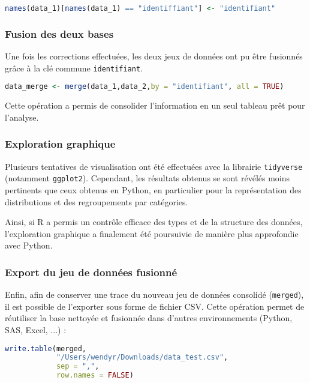 \begin{lstlisting}[language=R, caption=Correction de l’orthographe d’une variable]
    names(data_1)[names(data_1) == "identiffiant"] <- "identifiant"
\end{lstlisting}

\subsubsection{Fusion des deux bases}
Une fois les corrections effectuées, les deux jeux de données ont pu être fusionnés grâce à la clé commune \texttt{identifiant}.  

\begin{lstlisting}[language=R, caption=Fusion des bases de données]
    data_merge <- merge(data_1,data_2,by = "identifiant", all = TRUE)
\end{lstlisting}

Cette opération a permis de consolider l'information en un seul tableau prêt pour l'analyse.  

\subsubsection{Exploration graphique}
Plusieurs tentatives de visualisation ont été effectuées avec la librairie \texttt{tidyverse} (notamment \texttt{ggplot2}).  
Cependant, les résultats obtenus se sont révélés moins pertinents que ceux obtenus en Python, en particulier pour la représentation des distributions et des regroupements par catégories.  

Ainsi, si R a permis un contrôle efficace des types et de la structure des données, l'exploration graphique a finalement été poursuivie de manière plus approfondie avec Python.
\subsubsection{Export du jeu de données fusionné}
Enfin, afin de conserver une trace du nouveau jeu de données consolidé (\texttt{merged}), il est possible de l'exporter sous forme de fichier CSV.  
Cette opération permet de réutiliser la base nettoyée et fusionnée dans d'autres environnements (Python, SAS, Excel, ...) :

\begin{lstlisting}[language=R, caption=Exportation du jeu de données fusionné]
write.table(merged,
            "/Users/wendyr/Downloads/data_test.csv",
            sep = ",",
            row.names = FALSE)
\end{lstlisting}